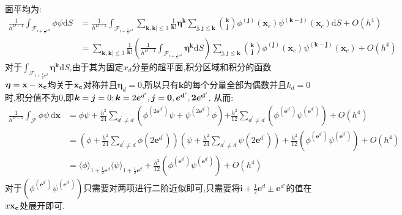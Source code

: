 \documentclass[12pt,halfline,a4paper]{ouparticle}
\begin{document}
面平均为:
\begin{equation*}
    \begin{aligned}
        \frac{1}{h^{D-1}}\int_{\mathcal{F}_{i+\frac12 e^d}} \phi \psi \text{d} S &= \frac{1}{h^{D-1}}\int_{\mathcal{F}_{i+\frac12 e^d}} \sum_{\mathbf{k}, \mathbf{k} | \leq3} \frac{1} {\mathbf{k}!} \boldsymbol{\eta}^{\mathbf{k}} \sum_{\mathbf{j}, \mathbf{j} \leq\mathbf{k}} \binom{\mathbf{k}} {\mathbf{j}} \phi^{( \mathbf{j} )} ( \mathbf{x}_{c} ) \psi^{( \mathbf{k}-\mathbf{j} )} ( \mathbf{x}_{c} ) \text{d} S + O(h^4)\\
        &= \sum_{\mathbf{k}, \mathbf{k} | \leq3} \frac{1} {\mathbf{k}!} (\frac{1}{h^{D-1}}\int_{\mathcal{F}_{i+\frac12 e^d}}\boldsymbol{\eta}^{\boldsymbol{k }}\text{d}S)\sum_{\mathbf{j}, \mathbf{j} \leq\mathbf{k}} \binom{\mathbf{k}} {\mathbf{j}} \phi^{( \mathbf{j} )} ( \mathbf{x}_{c} ) \psi^{( \mathbf{k}-\mathbf{j} )} ( \mathbf{x}_{c} ) + O(h^4)
    \end{aligned}
\end{equation*}
对于$\int_{\mathcal{F}_{i+\frac12 e^d}}\boldsymbol{\eta}^{\boldsymbol{k }}\text{d}S$,由于其为固定$x_d$分量的超平面,积分区域和积分的函数$\boldsymbol{\eta} = \bf x-\bf x_c$均关于$\bf x_c$对称并且$\boldsymbol{\eta}_d = 0$,所以只有$\boldsymbol{k}$的每个分量全部为偶数并且$k_d=0$时,积分值不为0,即$\boldsymbol{k} = \boldsymbol{j} = 0; \boldsymbol{k} = 2\boldsymbol{e}^{d'},\boldsymbol{j} = \bf 0,\boldsymbol{e}^{d'},2\boldsymbol{e}^{d'}$.
从而:
$$
\begin{aligned} 
    {{}} {{} {{\frac{1} {h^{\mathrm{D-1}}} \int_{\mathcal{F}} \phi\psi\, \mathrm{d} \mathbf{x}}}}  &=  {{} {{} {\phi\psi+\frac{h^{2}} {2 4} \sum_{d^{\prime} \neq d} \left( \phi^{\left( 2 \mathbf{e}^{d^{\prime}} \right)} \psi+\psi^{\left( 2 \mathbf{e}^{d^{\prime}} \right)} \phi\right)}}}  {{}}  {{} {{} {{+\frac{h^{2}} {1 2} \sum_{d^{\prime} \neq d} \left( \phi^{\left( \mathbf{e}^{d^{\prime}} \right)} \psi^{\left( \mathbf{e}^{d^{\prime}} \right)} \right)+O ( h^{4} )}}}} \\ 
    &=\left( \phi+\frac{h^{2}} {2 4} \sum_{d^{\prime} \neq d} \phi{\left( 2 \mathbf{e}^{d^{\prime}} \right)} \right) \left( \psi+\frac{h^{2}} {2 4} \sum_{d^{\prime} \neq d} \psi{\left( 2 \mathbf{e}^{d^{\prime}} \right)} \right)  {{{}}}  {{} {{} {{}+\frac{h^{2}} {1 2} \left( \phi^{\left( \mathbf{e}^{d^{\prime}} \right)} \psi^{\left( \mathbf{e}^{d^{\prime}} \right)} \right)+O ( h^{4} )}}} \\
    &=\langle\phi\rangle_{1+\frac{1} {2} \mathbf{e}^{d}} \langle\psi\rangle_{1+\frac{1} {2} \mathbf{e}^{d}}+\frac{h^{2}} {1 2} \left( \phi^{\left( \mathbf{e}^{d^{\prime}} \right)} \psi^{\left( \mathbf{e}^{d^{\prime}} \right)} \right)+O ( h^{4} )
\end{aligned} 
$$
对于$\left( \phi^{\left( \mathbf{e}^{d^{\prime}} \right)} \psi^{\left( \mathbf{e}^{d^{\prime}} \right)} \right)$只需要对两项进行二阶近似即可,只需要将$\mathbf{i}+\frac{1} {2} \mathbf{e}^{d}\pm \mathbf{e}^{d'}$的值在$x\bf x_c$处展开即可.
\end{document}
